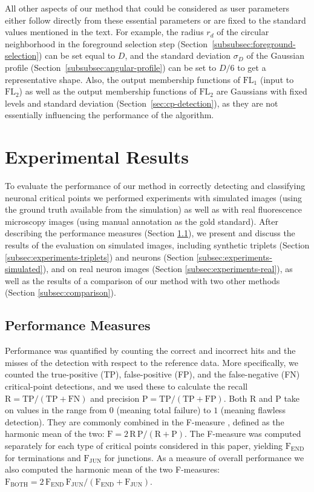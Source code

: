 \documentclass[twocolumn,natbib]{svjour3}
\begin{document}
All other aspects of our method that could be considered as user parameters either follow directly from these essential parameters or are fixed to the standard values mentioned in the text. For example, the radius $r_d$ of the circular neighborhood in the foreground selection step (Section~\ref{subsubsec:foreground-selection}) can be set equal to $D$, and the standard deviation $\sigma_{\!D}$ of the Gaussian profile (Section~\ref{subsubsec:angular-profile}) can be set to $D/6$ to get a representative shape. Also, the output membership functions of $\textrm{FL}_1$ (input to $\textrm{FL}_2$) as well as the output membership functions of $\textrm{FL}_2$ are Gaussians with fixed levels and standard deviation (Section~\ref{sec:cp-detection}), as they are not essentially influencing the performance of the algorithm.

\section{Experimental Results}
\label{sec:experiments}
To evaluate the performance of our method in correctly detecting and classifying neuronal critical points we performed experiments with simulated images (using the ground truth available from the simulation) as well as with real fluorescence microscopy images (using manual annotation as the gold standard). After describing the performance measures (Section \ref{subsec:measures}), we present and discuss the results of the evaluation on simulated images, including synthetic triplets (Section \ref{subsec:experiments-triplets}) and neurons (Section \ref{subsec:experiments-simulated}), and on real neuron images (Section \ref{subsec:experiments-real}), as well as the results of a comparison of our method with two other methods (Section \ref{subsec:comparison}).

\subsection{Performance Measures}
\label{subsec:measures}
Performance was quantified by counting the correct and incorrect hits and the misses of the detection with respect to the reference data. More specifically, we counted the true-positive (TP), false-positive (FP), and the false-negative (FN) critical-point detections, and we used these to calculate the recall $\textrm{R}=\textrm{TP}/(\textrm{TP}+\textrm{FN})$ and precision $\textrm{P}=\textrm{TP}/(\textrm{TP}+\textrm{FP})$. Both R and P take on values in the range from $0$ (meaning total failure) to $1$ (meaning flawless detection). They are commonly combined in the F-measure \citep{Powers-2011}, defined as the harmonic mean of the two: $\textrm{F}=2\,\textrm{R}\,\textrm{P}/(\textrm{R}+\textrm{P})$. The F-measure was computed separately for each type of critical points considered in this paper, yielding $\textrm{F}_{\textrm{END}}$ for terminations and $\textrm{F}_{\textrm{JUN}}$ for junctions. As a measure of overall performance we also computed the harmonic mean of the two F-measures: $\textrm{F}_{\textrm{BOTH}}=2\,\textrm{F}_{\textrm{END}}\,\textrm{F}_{\textrm{JUN}}/(\textrm{F}_{\textrm{END}}+\textrm{F}_{\textrm{JUN}})$.
\end{document}
